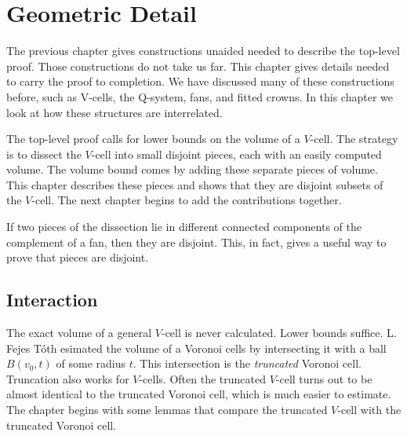 \chapter{Geometric Detail}%
    \label{sec:fine}

The previous chapter gives  constructions unaided
needed to describe the top-level proof.  
Those constructions do not take us far.   This
chapter gives details needed to carry the proof to completion. 
We have discussed many of these constructions before, such
as V-cells, the Q-system, fans, and fitted crowns.  In this
chapter we look at how these structures are interrelated.

The top-level proof calls for
lower bounds on the volume of a $V$-cell.  
The strategy is to dissect the $V$-cell into small disjoint
pieces, each with an easily computed volume.  The volume
bound comes by adding these separate pieces of volume.
This chapter describes these pieces and shows that
they are disjoint subsets of the $V$-cell.  The next chapter
begins to add the contributions together.

If two pieces of the dissection lie in different connected components of
the complement of a fan, then they are disjoint.  This, in fact,
gives a useful way to  prove that pieces are disjoint. 

\section{Interaction}




The exact volume of a general $V$-cell is never calculated.  
Lower bounds suffice.  L. Fejes T\'oth esimated
the volume of a Voronoi cells by intersecting it with a ball
$B(v_0,t)$ of some radius $t$.  This intersection is the
{\it truncated} Voronoi cell.  Truncation  also works for $V$-cells.
Often the truncated $V$-cell turns out to be almost identical to the
truncated Voronoi cell, which is much easier to estimate.
The chapter begins with some lemmas that compare the truncated $V$-cell with
the truncated Voronoi cell.


